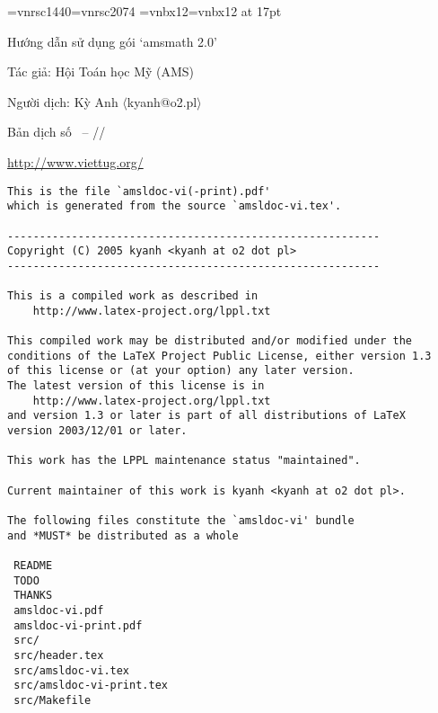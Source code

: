 

\pagestyle{headings}




\thispagestyle{empty}

\begingroup
	{\font\mysign=vnrsc1440\relax\font\ftitle=vnrsc2074}%
	{\font\mysign=vnbx12\relax\font\ftitle=vnbx12 at 17pt}
	\null
	\vskip6cm
	\centerline{\ftitle Hướng dẫn sử dụng gói `amsmath 2.0'}
	\vskip30mm
	\centerline{\mysign	Tác giả: Hội Toán học Mỹ (AMS)}
	\vskip3mm
	\centerline{\mysign Người dịch: Kỳ Anh $\langle${kyanh@o2.pl}$\rangle$}
	\vskip25mm
	\centerline{\Large Bản dịch số
		{\mysign\the\buildnum\ -- \the\year/\the\month/\the\day}}
	\vfill
	\centerline{\LARGE\url{http://www.viettug.org/}}
\endgroup

\ifx\printversion\undefined
	\newpage
\else
	\cleardoublepage
\fi

\begin{verbatim}
This is the file `amsldoc-vi(-print).pdf'
which is generated from the source `amsldoc-vi.tex'.

----------------------------------------------------------
Copyright (C) 2005 kyanh <kyanh at o2 dot pl>
----------------------------------------------------------

This is a compiled work as described in
    http://www.latex-project.org/lppl.txt

This compiled work may be distributed and/or modified under the
conditions of the LaTeX Project Public License, either version 1.3
of this license or (at your option) any later version.
The latest version of this license is in
    http://www.latex-project.org/lppl.txt
and version 1.3 or later is part of all distributions of LaTeX
version 2003/12/01 or later.

This work has the LPPL maintenance status "maintained".

Current maintainer of this work is kyanh <kyanh at o2 dot pl>.

The following files constitute the `amsldoc-vi' bundle
and *MUST* be distributed as a whole

 README
 TODO
 THANKS
 amsldoc-vi.pdf
 amsldoc-vi-print.pdf
 src/
 src/header.tex
 src/amsldoc-vi.tex
 src/amsldoc-vi-print.tex
 src/Makefile
\end{verbatim}

